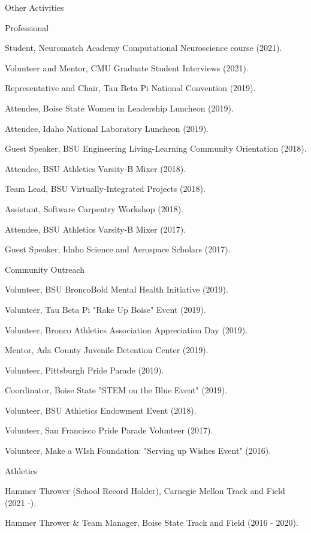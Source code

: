 \documentclass{resume} %
\begin{document}
\begin{rSection}{Other Activities}
\begin{rSubsection2}{Professional}{}{}{}
\item Student, Neuromatch Academy Computational Neuroscience course (2021).
\item Volunteer and Mentor, CMU Graduate Student Interviews (2021).
\item Representative and Chair, Tau Beta Pi National Convention (2019). 
\item Attendee, Boise State Women in Leadership Luncheon (2019).
\item Attendee, Idaho National Laboratory Luncheon (2019).
\item Guest Speaker, BSU Engineering Living-Learning Community Orientation (2018).
\item Attendee, BSU Athletics Varsity-B Mixer (2018).
\item Team Lead, BSU Virtually-Integrated Projects (2018).
\item Assistant, Software Carpentry Workshop (2018).
\item Attendee, BSU Athletics Varsity-B Mixer (2017).
\item Guest Speaker, Idaho Science and Aerospace Scholars (2017).
\end{rSubsection2}
\begin{rSubsection2}{Community Outreach}{}{}{}
\item Volunteer, BSU BroncoBold Mental Health Initiative (2019). 
\item Volunteer, Tau Beta Pi "Rake Up Boise" Event (2019).
\item Volunteer, Bronco Athletics Association Appreciation Day (2019).
\item Mentor, Ada County Juvenile Detention Center (2019).
\item Volunteer, Pittsburgh Pride Parade (2019).
\item Coordinator, Boise State "STEM on the Blue Event" (2019).
\item Volunteer, BSU Athletics Endowment Event (2018).
\item Volunteer, San Francisco Pride Parade Volunteer (2017).
\item Volunteer, Make a WIsh Foundation: "Serving up Wishes Event" (2016). 
\end{rSubsection2}
\begin{rSubsection2}{Athletics}{}{}{}
\item Hammer Thrower (School Record Holder), Carnegie Mellon Track and Field (2021 -).
\item Hammer Thrower \& Team Manager, Boise State Track and Field (2016 - 2020).
\end{rSubsection2}
\end{rSection}
\end{document}
